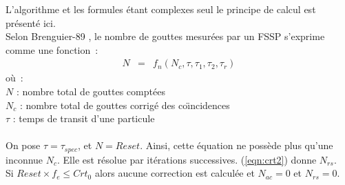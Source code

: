 
L'algorithme et les formules \'etant complexes
seul le principe de calcul est pr\'esent\'e ici.\\
Selon Brenguier-89 \cite{Brenguier-89}, 
le nombre de gouttes mesur\'ees par un FSSP
s'exprime comme une fonction~: \\ 
\begin{eqnarray}
N & = & f_n ( N_c, \tau, \tau_1, \tau_2, \tau_r ) \label{eqn:crt2}
\end{eqnarray}
o\`u~:\\
$N$ : nombre total de gouttes compt\'ees \\
$N_c$ : nombre total de gouttes corrig\'e des
co\"{\i}ncidences \\
$\tau $ : temps de transit d'une particule \\
\\
On pose $\tau = \tau_{spec}$, et $N=Reset$.
Ainsi, cette \'equation ne
poss\`ede plus qu'une inconnue $N_c$. 
Elle est r\'esolue par it\'erations successives.   
(\ref{eqn:crt2}) donne $N_{rs}$.\\
Si $Reset\times f_e \le Crt_0$ alors aucune correction
est calcul\'ee et $N_{ac}=0$ et $N_{rs}=0$.
